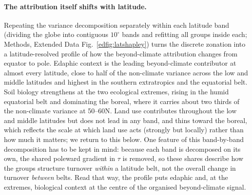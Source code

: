 \documentclass[12pt, a4paper]{article}
\begin{document}
\paragraph{The attribution itself shifts with latitude.}
Repeating the variance decomposition separately within each latitude band (dividing
the globe into contiguous $10^{\circ}$ bands and refitting all groups inside each;
Methods, Extended Data Fig.~\ref{edfig:latshapley}) turns the discrete zonation into
a latitude-resolved profile of how the beyond-climate attribution changes from equator to
pole. Edaphic context is the leading beyond-climate contributor at almost every
latitude, close to half of the non-climate variance across the low and middle
latitudes and highest in the southern extratropics and the equatorial belt. Soil
biology strengthens at the two
ecological extremes, rising in the humid equatorial belt and dominating the boreal,
where it carries about two thirds of the non-climate variance at 50--60\textdegree N.
Land use contributes throughout the low and middle latitudes but does not lead in any
band, and thins toward the boreal, which reflects the scale at which land use acts
(strongly but locally) rather than how much it matters; we return to this below. One
feature of this band-by-band decomposition has to be kept in mind:
because each band is decomposed on its own, the shared poleward gradient in $\tau$ is
removed, so these shares describe how the groups structure turnover \emph{within} a
latitude belt, not the overall change in turnover \emph{between} belts. Read that way,
the profile puts edaphic and, at the extremes, biological context at the centre of
the organised beyond-climate signal.
\end{document}
